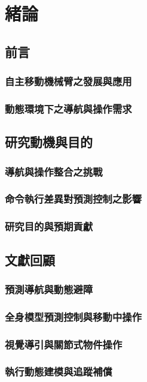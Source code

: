 
\chapter{緒論}
\section{前言}
\subsection{自主移動機械臂之發展與應用}
\subsection{動態環境下之導航與操作需求}
\section{研究動機與目的}
\subsection{導航與操作整合之挑戰}
\subsection{命令執行差異對預測控制之影響}
\subsection{研究目的與預期貢獻}

\section{文獻回顧}
\subsection{預測導航與動態避障}
\subsection{全身模型預測控制與移動中操作}
\subsection{視覺導引與關節式物件操作}
\subsection{執行動態建模與追蹤補償}
